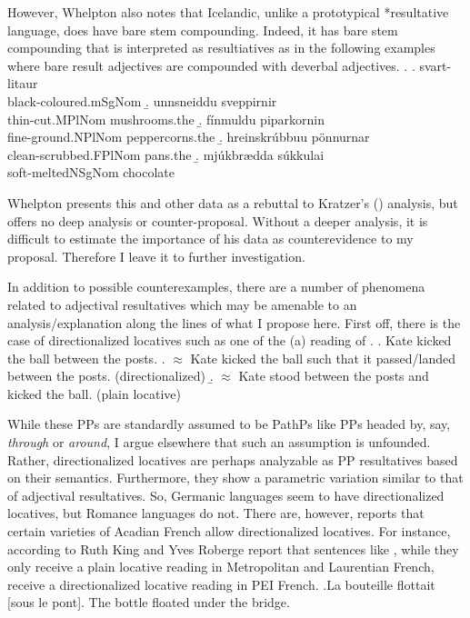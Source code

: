 \documentclass[MilwayThesis]{subfiles}
\begin{document}
However, Whelpton also notes that Icelandic, unlike a prototypical *resultative	language, does have bare stem compounding.
Indeed, it has bare stem compounding that is interpreted as resultiatives as in the following examples where bare result adjectives are compounded with deverbal adjectives.
\ex. 
\a. svart-lita\dh{}ur\\
black-coloured.mSgNom
\b. \th{}unnsneiddu sveppirnir\\
thin-cut.MPlNom mushrooms.the
\b. f\'{i}nmuldu piparkornin\\
fine-ground.NPlNom peppercorns.the
\b. hreinskr\'{u}bbu\dh{}u p\"{o}nnurnar\\
clean-scrubbed.FPlNom pans.the
\b. mj\'{u}kbr\ae{}dda s\'{u}kkula\dh{}i\\
soft-meltedNSgNom chocolate

Whelpton presents this and other data as a rebuttal to Kratzer's (\citeyear{kratzer2004building}) analysis, but offers no deep analysis or counter-proposal.
Without a deeper analysis, it is difficult to estimate the importance of his data as counterevidence to my proposal.
Therefore I leave it to further investigation.

In addition to possible counterexamples, there are a number of phenomena related to adjectival resultatives which may be amenable to an analysis/explanation along the lines of what I propose here.
First off, there is the case of directionalized locatives such as one of the (a) reading of \Next.
\ex. Kate kicked the ball between the posts.
\a. $\approx$ Kate kicked the ball such that it passed/landed between the posts. (directionalized)
\b. $\approx$ Kate stood between the posts and kicked the ball. (plain locative)

While these PPs are standardly assumed to be PathPs like PPs headed by, say, \textit{through} or \textit{around}, I argue elsewhere \parencite{milway20xxmodifying} that such an assumption is unfounded.
Rather, directionalized locatives are perhaps analyzable as PP resultatives based on their semantics.
Furthermore, they show a parametric variation similar to that of adjectival resultatives.
So, Germanic languages seem to have directionalized locatives, but Romance languages do not.
There are, however, reports that certain varieties of Acadian French allow directionalized locatives.
For instance, according to Ruth King and Yves Roberge \parencite[p.c. cited in][253--254]{rooryck1996prepositions} report that sentences like \Next, while they only receive a plain locative reading in Metropolitan and Laurentian French, receive a directionalized locative reading in PEI French.
\ex.La bouteille flottait [sous le pont].
The bottle floated under the bridge. \parencite{rooryck1996prepositions}
\end{document}
